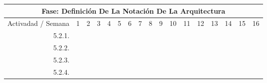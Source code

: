 \documentclass[12pt]{article}
\begin{document}
\begin{table}[H]
{\begin{tabular}{|rllllllllllllllll|}
        \multicolumn{17}{|c|}{\cellcolor[HTML]{D9D9D9}Fase: Definición De La Notación De La Arquitectura} \\ \hline
        \multicolumn{1}{|l|}{\cellcolor[HTML]{D9D9D9}Activadad / Semana} & \multicolumn{1}{c|}{\cellcolor[HTML]{B6D7A8}1} & \multicolumn{1}{c|}{\cellcolor[HTML]{B6D7A8}2} & \multicolumn{1}{c|}{\cellcolor[HTML]{B6D7A8}3} & \multicolumn{1}{c|}{\cellcolor[HTML]{B6D7A8}4} & \multicolumn{1}{c|}{\cellcolor[HTML]{A4C2F4}5} & \multicolumn{1}{c|}{\cellcolor[HTML]{A4C2F4}6} & \multicolumn{1}{c|}{\cellcolor[HTML]{A4C2F4}7} & \multicolumn{1}{c|}{\cellcolor[HTML]{A4C2F4}8} & \multicolumn{1}{c|}{\cellcolor[HTML]{B4A7D6}9} & \multicolumn{1}{c|}{\cellcolor[HTML]{B4A7D6}10} & \multicolumn{1}{c|}{\cellcolor[HTML]{B4A7D6}11} & \multicolumn{1}{c|}{\cellcolor[HTML]{B4A7D6}12} & \multicolumn{1}{c|}{\cellcolor[HTML]{EA9999}13} & \multicolumn{1}{c|}{\cellcolor[HTML]{EA9999}14} & \multicolumn{1}{c|}{\cellcolor[HTML]{EA9999}15} & \multicolumn{1}{c|}{\cellcolor[HTML]{EA9999}16} \\ \hline
        \multicolumn{1}{|r|}{5.2.1.} & \multicolumn{1}{l|}{} & \multicolumn{1}{l|}{} & \multicolumn{1}{l|}{} & \multicolumn{1}{c|}{\cellcolor[HTML]{B6D7A8}} & \multicolumn{1}{l|}{} & \multicolumn{1}{l|}{} & \multicolumn{1}{l|}{} & \multicolumn{1}{l|}{} & \multicolumn{1}{l|}{} & \multicolumn{1}{l|}{} & \multicolumn{1}{l|}{} & \multicolumn{1}{l|}{} & \multicolumn{1}{l|}{} & \multicolumn{1}{l|}{} & \multicolumn{1}{l|}{} &  \\ \hline
        \multicolumn{1}{|r|}{5.2.2.} & \multicolumn{1}{l|}{} & \multicolumn{1}{l|}{} & \multicolumn{1}{l|}{} & \multicolumn{1}{c|}{\cellcolor[HTML]{B6D7A8}} & \multicolumn{1}{c|}{\cellcolor[HTML]{A4C2F4}} & \multicolumn{1}{l|}{} & \multicolumn{1}{l|}{} & \multicolumn{1}{l|}{} & \multicolumn{1}{l|}{} & \multicolumn{1}{l|}{} & \multicolumn{1}{l|}{} & \multicolumn{1}{l|}{} & \multicolumn{1}{l|}{} & \multicolumn{1}{l|}{} & \multicolumn{1}{l|}{} &  \\ \hline
        \multicolumn{1}{|r|}{5.2.3.} & \multicolumn{1}{l|}{} & \multicolumn{1}{l|}{} & \multicolumn{1}{l|}{} & \multicolumn{1}{l|}{} & \multicolumn{1}{c|}{\cellcolor[HTML]{A4C2F4}} & \multicolumn{1}{c|}{\cellcolor[HTML]{A4C2F4}} & \multicolumn{1}{l|}{} & \multicolumn{1}{l|}{} & \multicolumn{1}{l|}{} & \multicolumn{1}{l|}{} & \multicolumn{1}{l|}{} & \multicolumn{1}{l|}{} & \multicolumn{1}{l|}{} & \multicolumn{1}{l|}{} & \multicolumn{1}{l|}{} &  \\ \hline
        \multicolumn{1}{|r|}{5.2.4.} & \multicolumn{1}{l|}{} & \multicolumn{1}{l|}{} & \multicolumn{1}{l|}{} & \multicolumn{1}{l|}{} & \multicolumn{1}{c|}{\cellcolor[HTML]{A4C2F4}} & \multicolumn{1}{c|}{\cellcolor[HTML]{A4C2F4}} & \multicolumn{1}{l|}{} & \multicolumn{1}{l|}{} & \multicolumn{1}{l|}{} & \multicolumn{1}{l|}{} & \multicolumn{1}{l|}{} & \multicolumn{1}{l|}{} & \multicolumn{1}{l|}{} & \multicolumn{1}{l|}{} & \multicolumn{1}{l|}{} &  \\ \hline

\end{tabular}}
\end{table}
\end{document}
